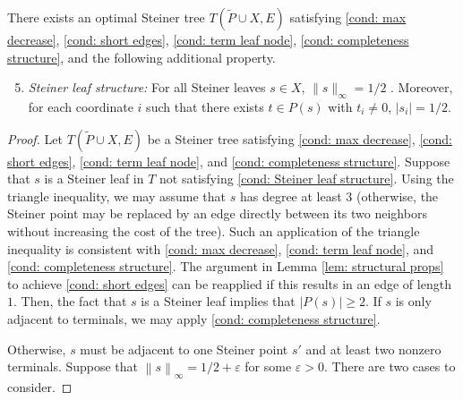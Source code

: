 \documentclass{theoretics}
\newcommand{\1}{\textbf{1}}
\newcommand{\norm}[1]{\left\lVert#1\right\rVert}
\renewcommand{\tilde}{\widetilde}
\begin{document}
\begin{lemma} \label{lem: Steiner leaf struct}
There exists an optimal Steiner tree  $T(\tilde{P} \cup X, E)$ satisfying \ref{cond: max decrease}, \ref{cond: short edges}, \ref{cond: term leaf node}, \ref{cond: completeness structure}, and the following additional property.

\begin{enumerate}[label=(P\arabic*)]
\setcounter{enumi}{4}
    \item \textit{Steiner leaf structure:}  For all Steiner leaves $s \in X$, $\|s\|_{\infty} = 1/2$ \label{cond: Steiner leaf structure}. Moreover, for each coordinate $i$ such that there exists $t \in P(s)$ with $t_i \neq 0$, $|s_i| = 1/2$.
\end{enumerate}
\end{lemma}
\begin{proof}
Let $T(\tilde{P} \cup X, E)$ be a Steiner tree satisfying \ref{cond: max decrease}, \ref{cond: short edges}, \ref{cond: term leaf node}, and \ref{cond: completeness structure}. Suppose that  $s$ is a Steiner leaf in $T$ not satisfying \ref{cond: Steiner leaf structure}. Using the triangle inequality, we may assume that $s$ has degree at least $3$ (otherwise, the Steiner point may be replaced by an edge directly between its two neighbors without increasing the cost of the tree). Such an application of the triangle inequality is consistent with \ref{cond: max decrease}, \ref{cond: term leaf node}, and \ref{cond: completeness structure}. The argument in Lemma \ref{lem: structural props} to achieve \ref{cond: short edges} can be reapplied if this results in an edge of length $1$. Then, the fact that $s$ is a Steiner leaf implies that $|P(s)| \geq 2$. If $s$ is only adjacent to terminals, we may apply \ref{cond: completeness structure}.

Otherwise, $s$ must be adjacent to one Steiner point $s'$ and at least two nonzero terminals. Suppose that $\norm{s}_{\infty} = 1/2 + \varepsilon$ for some $\varepsilon > 0$. There are two cases to consider. 


\end{proof}
\end{document}
